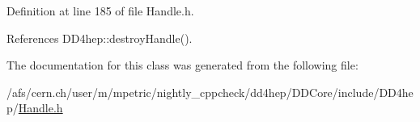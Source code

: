 Definition at line 185 of file Handle.\+h.



References D\+D4hep\+::destroy\+Handle().



The documentation for this class was generated from the following file\+:\begin{DoxyCompactItemize}
\item 
/afs/cern.\+ch/user/m/mpetric/nightly\+\_\+cppcheck/dd4hep/\+D\+D\+Core/include/\+D\+D4hep/\hyperlink{_handle_8h}{Handle.\+h}\end{DoxyCompactItemize}
